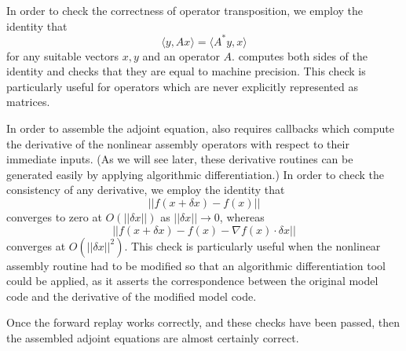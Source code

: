 In order to 
check the correctness of operator transposition, we employ the identity
that
\begin{equation*}
\langle y, Ax \rangle = \langle A^* y, x \rangle
\end{equation*}
for any suitable vectors $x, y$ and an operator $A$. \libadjoint computes both
sides of the identity and checks that they are equal to machine precision. This
check is particularly useful for operators which are never explicitly
represented as matrices.

In order to assemble the adjoint equation, \libadjoint also requires
callbacks which compute the derivative of the nonlinear assembly operators
with respect to their immediate inputs. (As we will see later, these
derivative routines can be generated easily by applying algorithmic
differentiation.) In order to check the consistency of any derivative,
we employ the identity that
\begin{equation*}
\left|\left| f(x + \delta x) - f(x) \right|\right|
\end{equation*}
converges to zero at $O(\left|\left| \delta x \right|\right|)$ as $\left|\left|\delta x\right|\right| \rightarrow 0$, whereas
\begin{equation*}
\left|\left| f(x + \delta x) - f(x) - \nabla f(x)\cdot \delta x\right|\right|
\end{equation*}
converges at $O(\left|\left| \delta x \right|\right|^2)$. This check is
particularly useful when the nonlinear assembly routine had to be
modified so that an algorithmic differentiation tool could be applied,
as it asserts the correspondence between the original model code
and the derivative of the modified model code.

Once the forward replay works correctly, and these checks have been
passed, then the assembled adjoint equations are almost certainly correct.

